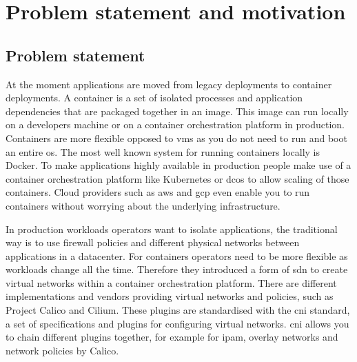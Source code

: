 \chapter{Problem statement and motivation}

\section{Problem statement}
At the moment applications are moved from legacy deployments to container deployments. A container is a set of isolated processes and application dependencies that are packaged together in an image. This image can run locally on a developers machine or on a container orchestration platform in production. Containers are more flexible opposed to \glspl{vm} as you do not need to run and boot an entire \gls{os}. The most well known system for running containers locally is Docker\cite{docker}. To make applications highly available in production people make use of a container orchestration platform like Kubernetes\cite{kubernetes} or \gls{dcos}\cite{dcos} to allow scaling of those containers. Cloud providers such as \gls{aws}\cite{aws} and \gls{gcp}\cite{gcp} even enable you to run containers without worrying about the underlying infrastructure.

In production workloads operators want to isolate applications, the traditional way is to use firewall policies and different physical networks between applications in a datacenter. For containers operators need to be more flexible as workloads change all the time. Therefore they introduced a form of \gls{sdn} to create virtual networks within a container orchestration platform.  There are different implementations and vendors providing virtual networks and policies, such as Project Calico\cite{calico} and Cilium\cite{cilium}. These plugins are standardised with the \gls{cni}\cite{cni} standard, a set of specifications and plugins for configuring virtual networks. \Gls{cni} allows you to chain different plugins together, for example for \gls{ipam}, overlay networks and network policies by Calico.

